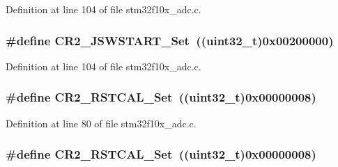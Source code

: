 Definition at line 104 of file stm32f10x\+\_\+adc.\+c.

\subsubsection[{\texorpdfstring{C\+R2\+\_\+\+J\+S\+W\+S\+T\+A\+R\+T\+\_\+\+Set}{CR2_JSWSTART_Set}}]{\setlength{\rightskip}{0pt plus 5cm}\#define C\+R2\+\_\+\+J\+S\+W\+S\+T\+A\+R\+T\+\_\+\+Set~(({\bf uint32\+\_\+t})0x00200000)}\hypertarget{group___a_d_c___private___defines_ga5292617782f3327f2e1ed0bd9461704e}{}\label{group___a_d_c___private___defines_ga5292617782f3327f2e1ed0bd9461704e}


Definition at line 104 of file stm32f10x\+\_\+adc.\+c.

\subsubsection[{\texorpdfstring{C\+R2\+\_\+\+R\+S\+T\+C\+A\+L\+\_\+\+Set}{CR2_RSTCAL_Set}}]{\setlength{\rightskip}{0pt plus 5cm}\#define C\+R2\+\_\+\+R\+S\+T\+C\+A\+L\+\_\+\+Set~(({\bf uint32\+\_\+t})0x00000008)}\hypertarget{group___a_d_c___private___defines_gaf256d4606fbe82d7e4cdc8d177653b53}{}\label{group___a_d_c___private___defines_gaf256d4606fbe82d7e4cdc8d177653b53}


Definition at line 80 of file stm32f10x\+\_\+adc.\+c.

\subsubsection[{\texorpdfstring{C\+R2\+\_\+\+R\+S\+T\+C\+A\+L\+\_\+\+Set}{CR2_RSTCAL_Set}}]{\setlength{\rightskip}{0pt plus 5cm}\#define C\+R2\+\_\+\+R\+S\+T\+C\+A\+L\+\_\+\+Set~(({\bf uint32\+\_\+t})0x00000008)}\hypertarget{group___a_d_c___private___defines_gaf256d4606fbe82d7e4cdc8d177653b53}{}\label{group___a_d_c___private___defines_gaf256d4606fbe82d7e4cdc8d177653b53}


